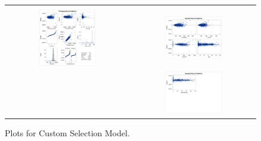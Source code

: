 \documentclass[11pt]{scrartcl} %
\begin{document}
\begin{figure}[H] %
	\centering
	\begin{tabular}{p{} p{}}
	\hline
	\multicolumn{1}{|c}{} &  \multicolumn{1}{c|}{} \\
		\multicolumn{1}{|c}{\includegraphics[width=0.48\textwidth]{../graphics/A2CustAss1}} &
		\multicolumn{1}{c|}{\includegraphics[width=0.48\textwidth]{../graphics/A2CustAss2}}\\
		& \multicolumn{1}{c|}{\includegraphics[width=0.48\textwidth]{../graphics/A2CustAss3}}\\
		\hline
	\end{tabular}		
	\caption{Plots for Custom Selection Model.} %
	\label{fig:A2CustomAss}
\end{figure}
\end{document}
